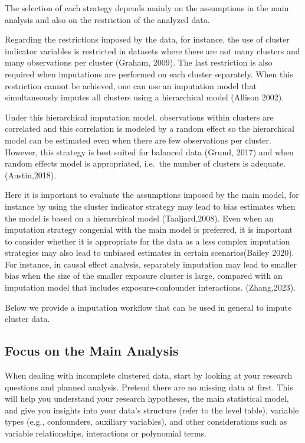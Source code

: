 \documentclass[
  article]{jss}
\begin{document}
The selection of each strategy depends mainly on the assumptions in the
main analysis and also on the restriction of the analyzed data.

Regarding the restrictions imposed by the data, for instance, the use of
cluster indicator variables is restricted in datasets where there are
not many clusters and many observations per cluster (Graham, 2009). The
last restriction is also required when imputations are performed on each
cluster separately. When this restriction cannot be achieved, one can
use an imputation model that simultaneously imputes all clusters using a
hierarchical model (Allison 2002).

Under this hierarchical imputation model, observations within clusters
are correlated and this correlation is modeled by a random effect so the
hierarchical model can be estimated even when there are few observations
per cluster. However, this strategy is best suited for balanced data
(Grund, 2017) and when random effects model is appropriated, i.e.~the
number of clusters is adequate. (Austin,2018).

Here it is important to evaluate the assumptions imposed by the main
model, for instance by using the cluster indicator strategy may lead to
bias estimates when the model is based on a hierarchical model
(Taaljard,2008). Even when an imputation strategy congenial with the
main model is preferred, it is important to consider whether it is
appropriate for the data as a less complex imputation strategies may
also lead to unbiased estimates in certain scenarios(Bailey 2020). For
instance, in causal effect analysis, separately imputation may lead to
smaller bias when the size of the smaller exposure cluster is large,
compared with an imputation model that includes exposure-confounder
interactions. (Zhang,2023).

Below we provide a imputation workflow that can be used in general to
impute cluster data.

\hypertarget{focus-on-the-main-analysis}{%
\subsection{Focus on the Main
Analysis}\label{focus-on-the-main-analysis}}

When dealing with incomplete clustered data, start by looking at your
research questions and planned analysis. Pretend there are no missing
data at first. This will help you understand your research hypotheses,
the main statistical model, and give you insights into your data's
structure (refer to the level table), variable types (e.g., confounders,
auxiliary variables), and other considerations such as variable
relationships, interactions or polynomial terms.
\end{document}
